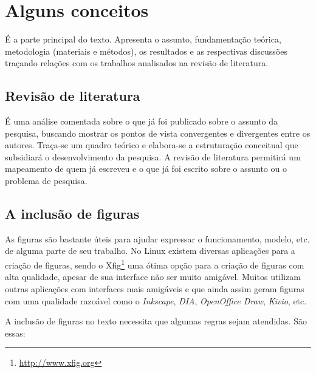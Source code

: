 
\chapter{Alguns conceitos}
\label{c_cap2}

É a parte principal do texto. Apresenta o assunto, fundamentação teórica, metodologia (materiais e métodos), os resultados e as respectivas discussões traçando relações com os trabalhos analisados na revisão de literatura.

\section{Revisão de literatura}\label{s_c2_revisao}

É uma análise comentada sobre o que já foi publicado sobre o assunto da pesquisa, buscando mostrar os pontos de vista convergentes e divergentes entre os autores. Traça-se um quadro teórico e elabora-se a estruturação conceitual que subsidiará o desenvolvimento da pesquisa. A revisão de literatura permitirá um mapeamento de quem já escreveu e o que já foi escrito sobre o assunto ou o problema de pesquisa.






\section{A inclusão de figuras}
\label{s_c2_figuras}

As figuras são bastante úteis para ajudar expressar o funcionamento, modelo, etc. de alguma parte de seu trabalho. No Linux existem diversas aplicações para a criação de figuras, sendo o Xfig\footnote{\url{http://www.xfig.org}} uma ótima opção para a criação de figuras com alta qualidade, apesar de sua interface não ser muito amigável. Muitos utilizam outras aplicações com interfaces mais amigáveis e que ainda assim geram figuras com uma qualidade razoável como o \textit{Inkscape}, \textit{DIA}, \textit{OpenOffice Draw}, \textit{Kivio}, etc.

A inclusão de figuras no texto necessita que algumas regras sejam atendidas. São essas:

